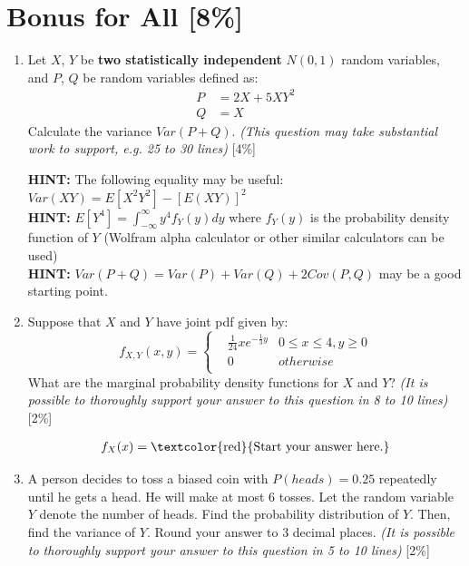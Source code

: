 \documentclass{article}
\begin{document}
\section{Bonus for All [8\%]}
\begin{enumerate}[label=(\alph*)]
    \item Let $X$, $Y$ be \textbf{two statistically independent} $N(0, 1)$ random variables, and $P$, $Q$ be random variables defined as: 
    \begin{align*}
        P &= 2X + 5XY^2 \\
        Q &= X
    \end{align*}
    Calculate the variance $Var(P + Q)$. \textit{(This question may take substantial work to support, e.g. 25 to 30 lines)} [4\%]
    
    \textbf{HINT:} The following equality may be useful: $Var(XY) = E[X^2Y^2] - [E(XY)]^2$ \\
    \textbf{HINT:} $E[Y^4] = \int_{-\infty}^{\infty}y^4 f_Y(y)dy$ where $f_Y(y)$ is the probability density function of $Y$ (Wolfram alpha calculator or other similar calculators can be used) \\
    \textbf{HINT:} $Var(P + Q) = Var(P) + Var(Q) + 2Cov(P, Q)$ may be a good starting point.
    
    \item Suppose that $X$ and $Y$ have joint pdf given by:
    $$f_{X,Y}(x,y)=\left\{
    \begin{aligned}
        &\frac{1}{24}xe^{-\frac{1}{3}y} & 0 \leq x \leq 4, y \geq 0 \\
        &0 & otherwise\\
    \end{aligned}\right.$$
    What are the marginal probability density functions for $X$ and  $Y$? \textit{(It is possible to thoroughly support your answer to this question in 8 to 10 lines)} [2\%]

    \begin{align*}
        f_X(x) &= \text{\textcolor{red}{Start your answer here.}} \\
    \end{align*}

    \item A person decides to toss a biased coin with $P(heads)=0.25$ repeatedly until he gets a head. He will make at most 6 tosses. Let the random variable $Y$ denote the number of heads. Find the probability distribution of $Y$. Then, find the variance of $Y$. Round your answer to 3 decimal places. \textit{(It is possible to thoroughly support your answer to this question in 5 to 10 lines)} [2\%]    
\end{enumerate}

\printbibliography
\end{document}
